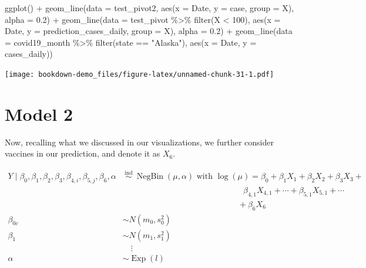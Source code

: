 \documentclass[
]{book}
\newenvironment{Shaded}{\begin{snugshade}}{\end{snugshade}}
\newcommand{\AttributeTok}[1]{\textcolor[rgb]{0.77,0.63,0.00}{#1}}
\newcommand{\DecValTok}[1]{\textcolor[rgb]{0.00,0.00,0.81}{#1}}
\newcommand{\FloatTok}[1]{\textcolor[rgb]{0.00,0.00,0.81}{#1}}
\newcommand{\FunctionTok}[1]{\textcolor[rgb]{0.00,0.00,0.00}{#1}}
\newcommand{\NormalTok}[1]{#1}
\newcommand{\SpecialCharTok}[1]{\textcolor[rgb]{0.00,0.00,0.00}{#1}}
\newcommand{\StringTok}[1]{\textcolor[rgb]{0.31,0.60,0.02}{#1}}
\begin{document}
\begin{Shaded}
\begin{Highlighting}[]
\FunctionTok{ggplot}\NormalTok{() }\SpecialCharTok{+}
  \FunctionTok{geom\_line}\NormalTok{(}\AttributeTok{data =}\NormalTok{ test\_pivot2, }\FunctionTok{aes}\NormalTok{(}\AttributeTok{x =}\NormalTok{ Date, }\AttributeTok{y =}\NormalTok{ case, }\AttributeTok{group =}\NormalTok{ X), }\AttributeTok{alpha =} \FloatTok{0.2}\NormalTok{) }\SpecialCharTok{+}
  \FunctionTok{geom\_line}\NormalTok{(}\AttributeTok{data =}\NormalTok{ test\_pivot }\SpecialCharTok{\%\textgreater{}\%} \FunctionTok{filter}\NormalTok{(X }\SpecialCharTok{\textless{}} \DecValTok{100}\NormalTok{), }\FunctionTok{aes}\NormalTok{(}\AttributeTok{x =}\NormalTok{ Date, }\AttributeTok{y =}\NormalTok{ prediction\_cases\_daily, }\AttributeTok{group =}\NormalTok{ X), }\AttributeTok{alpha =} \FloatTok{0.2}\NormalTok{) }\SpecialCharTok{+}
  \FunctionTok{geom\_line}\NormalTok{(}\AttributeTok{data =}\NormalTok{ covid19\_month }\SpecialCharTok{\%\textgreater{}\%} 
          \FunctionTok{filter}\NormalTok{(state }\SpecialCharTok{==} \StringTok{"Alaska"}\NormalTok{), }\FunctionTok{aes}\NormalTok{(}\AttributeTok{x =}\NormalTok{ Date, }\AttributeTok{y =}\NormalTok{ cases\_daily))}
\end{Highlighting}
\end{Shaded}

\texttt{[image: bookdown-demo\_files/figure-latex/unnamed-chunk-31-1.pdf]}

\hypertarget{model-2}{%
\section{Model 2}\label{model-2}}

Now, recalling what we discussed in our visualizations, we further consider vaccines in our prediction, and denote it as \(X_6\).

\[
\begin{aligned}
Y \mid \beta_{0}, \beta_{1}, \beta_{2}, \beta_{3}, \beta_{4,i}, \beta_{5,j},\beta_6, \alpha & \stackrel{\text { ind }}{\sim} \operatorname{NegBin}\left(\mu, \alpha\right) \text { with } \log \left(\mu\right)=\beta_{0}+\beta_{1} X_{1}+\beta_{2} X_{2} + \beta_3X_{3}+\\&\qquad\qquad\qquad\qquad\qquad\qquad\qquad\text{ } \beta_{4,1}X_{4,1} +\cdots + \beta_{5,1}X_{5,1} + \cdots\\&\qquad\qquad\qquad\qquad\qquad\qquad\qquad\text{} +\beta_6X_6\\
\beta_{0 c} & \sim N\left(m_0, s_0^2\right) \\
\beta_{1} & \sim N\left(m_1, s_1^2\right) \\
&\quad\vdots\\
\alpha & \sim \operatorname{Exp}(l)
\end{aligned}
\]
\end{document}
